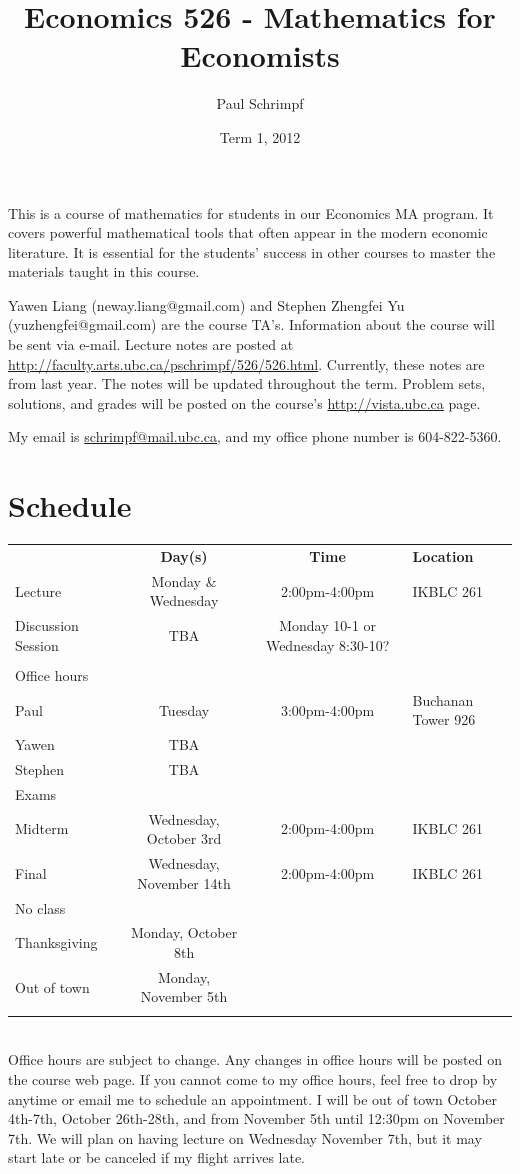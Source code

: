 \documentclass[10pt]{article}
\title{Economics 526 - Mathematics for Economists}
\date{Term 1, 2012}
\author{Paul Schrimpf}
\begin{document}
\maketitle

This is a course of mathematics for students in our Economics MA
program. It covers powerful mathematical tools that often appear
in the modern economic literature. It is essential for the students'
success in other courses to master the materials taught in this
course.

Yawen Liang (neway.liang@gmail.com) and Stephen Zhengfei Yu
(yuzhengfei@gmail.com) are the course TA's.  Information about the
course will be sent via e-mail.  Lecture notes are posted at
\url{http://faculty.arts.ubc.ca/pschrimpf/526/526.html}. Currently,
these notes are from last year. The notes will be updated throughout
the term. Problem sets, solutions, and grades will be posted on the
course's \url{http://vista.ubc.ca} page.

 My email is
\href{mailto:schrimp@mail.ubc.ca}{schrimpf@mail.ubc.ca}, and my office
phone number is 604-822-5360.

\section{Schedule}
\begin{tabular}{l c c l}
  \hline 
  & \textbf{Day(s)} & \textbf{Time} & \textbf{Location} \\
  Lecture & Monday \& Wednesday & 2:00pm-4:00pm & IKBLC 261  
  \\
  Discussion Session & TBA & Monday 10-1 or Wednesday 8:30-10?  \\  
  \\
  Office hours \\
  \; Paul & Tuesday & 3:00pm-4:00pm & Buchanan Tower 926 \\
  \; Yawen & TBA & & \\ 
  \; Stephen & TBA & & \\ \hline
  Exams \\
  \; Midterm & Wednesday, October 3rd & 2:00pm-4:00pm & IKBLC 261 \\
  \; Final & Wednesday, November 14th & 2:00pm-4:00pm & IKBLC 261 \\
  No class \\
  \; Thanksgiving & Monday, October 8th \\
  \; Out of town & Monday, November 5th \\  
  \\ \hline 
\end{tabular} \\
Office hours are subject to change. Any changes in office hours will
be posted on the course web page. If you cannot come to my office
hours, feel free to drop by anytime or email me to schedule an
appointment.  I will be out of town October 4th-7th, October
26th-28th, and from November 5th until 12:30pm on November 7th. We will
plan on having lecture on Wednesday November 7th, but it may start
late or be canceled if my flight arrives late. 
\end{document}
